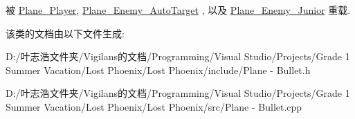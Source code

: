 被 \hyperlink{class_plane___player_ae68c08ce11fad9fd164c00eb4db6b348}{Plane\+\_\+\+Player}, \hyperlink{class_plane___enemy___auto_target_a79e6eda540d282205ce6151ae0b304ca}{Plane\+\_\+\+Enemy\+\_\+\+Auto\+Target} , 以及 \hyperlink{class_plane___enemy___junior_a686e46c9927793dd07235cac72d52405}{Plane\+\_\+\+Enemy\+\_\+\+Junior} 重载.



该类的文档由以下文件生成\+:\begin{DoxyCompactItemize}
\item 
D\+:/叶志浩文件夹/\+Vigilans的文档/\+Programming/\+Visual Studio/\+Projects/\+Grade 1 Summer Vacation/\+Lost Phoenix/\+Lost Phoenix/include/Plane -\/ Bullet.\+h\item 
D\+:/叶志浩文件夹/\+Vigilans的文档/\+Programming/\+Visual Studio/\+Projects/\+Grade 1 Summer Vacation/\+Lost Phoenix/\+Lost Phoenix/src/Plane -\/ Bullet.\+cpp\end{DoxyCompactItemize}
